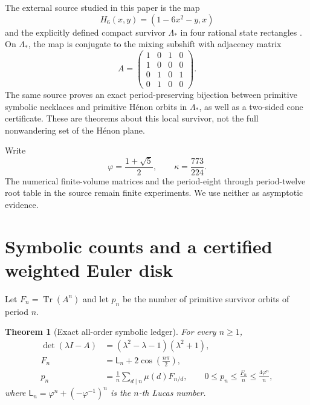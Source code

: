 \documentclass[11pt]{article}
\numberwithin{equation}{section}
\newtheorem{theorem}{Theorem}[section]
\theoremstyle{remark}
\newcommand{\Tr}{\operatorname{Tr}}
\newcommand{\Lam}{\Lambda}
\begin{document}
The external source studied in this paper is the map
\begin{equation}
 H_6(x,y)=(1-6x^2-y,x)
 \label{eq:henon-map}
\end{equation}
and the explicitly defined compact survivor \(\Lam_*\) in four rational
state rectangles \citep{WangWeightedHenon2026}.  On \(\Lam_*\), the map is
conjugate to the mixing subshift with adjacency matrix
\begin{equation}
 A=\begin{pmatrix}
 1&0&1&0\\
 1&0&0&0\\
 0&1&0&1\\
 0&1&0&0
 \end{pmatrix}.
 \label{eq:adjacency}
\end{equation}
The same source proves an exact period-preserving bijection between primitive
symbolic necklaces and primitive H\'enon orbits in \(\Lam_*\), as well as a
two-sided cone certificate.  These are theorems about this local survivor,
not the full nonwandering set of the H\'enon plane.

Write
\begin{equation}
 \varphi=\frac{1+\sqrt5}{2},
 \qquad
 \kappa=\frac{773}{224}.
 \label{eq:constants}
\end{equation}
The numerical finite-volume matrices and the period-eight through
period-twelve root table in the source remain finite experiments.  We use
neither as asymptotic evidence.

\section{Symbolic counts and a certified weighted Euler disk}

Let
\(
F_n=\Tr(A^n)
\)
and let \(p_n\) be the number of primitive survivor orbits of period \(n\).

\begin{theorem}[Exact all-order symbolic ledger]
\label{thm:symbolic-ledger}
For every \(n\ge1\),
\begin{align}
 \det(\lambda I-A)
 &=(\lambda^2-\lambda-1)(\lambda^2+1),
 \label{eq:characteristic}\\
 F_n
 &=\mathsf L_n+2\cos\!\left(\frac{n\pi}{2}\right),
 \label{eq:trace-lucas}\\
 p_n
 &=\frac1n\sum_{d\mid n}\mu(d)F_{n/d},
 \qquad
 0\le p_n\le\frac{F_n}{n}\le\frac{4\varphi^n}{n},
 \label{eq:primitive-envelope}
\end{align}
where \(\mathsf L_n=\varphi^n+(-\varphi^{-1})^n\) is the \(n\)-th Lucas
number.
\end{theorem}
\end{document}
